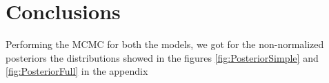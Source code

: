 \section{Conclusions}

Performing the MCMC for both the models, we got for the non-normalized posteriors the distributions showed in the figures \ref{fig:PosteriorSimple} and \ref{fig:PosteriorFull} in the appendix